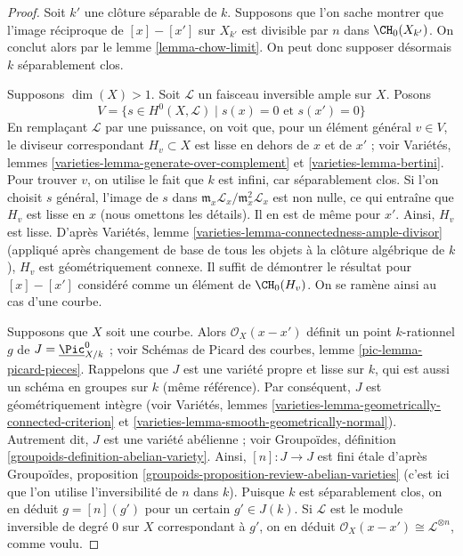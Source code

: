 \begin{proof}
Soit $k'$ une clôture séparable de $k$. Supposons que l'on sache montrer
que l'image réciproque de $[x] - [x']$ sur $X_{k'}$ est divisible par $n$ dans
$\CH_0(X_{k'})$. On conclut alors par le lemme \ref{lemma-chow-limit}.
On peut donc supposer désormais $k$ séparablement clos.

\medskip\noindent
Supposons $\dim(X) > 1$. Soit $\mathcal{L}$ un faisceau inversible ample sur $X$.
Posons
$$
V = \{s \in H^0(X, \mathcal{L}) \mid s(x) = 0\text{ et }s(x') = 0 \}
$$
En remplaçant $\mathcal{L}$ par une puissance, on voit que, pour
un élément général $v \in V$, le diviseur correspondant $H_v \subset X$ est lisse
en dehors de $x$ et de $x'$ ; voir
Variétés, lemmes \ref{varieties-lemma-generate-over-complement} et
\ref{varieties-lemma-bertini}. Pour trouver $v$, on utilise le fait que $k$ est infini,
car séparablement clos.
Si l'on choisit $s$ général, l'image de $s$ dans
$\mathfrak m_x\mathcal{L}_x/\mathfrak m_x^2\mathcal{L}_x$
est non nulle, ce qui entraîne que $H_v$ est lisse en $x$
(nous omettons les détails). Il en est de même pour $x'$. Ainsi, $H_v$ est lisse.
D'après Variétés, lemme \ref{varieties-lemma-connectedness-ample-divisor}
(appliqué après changement de base de tous les objets
à la clôture algébrique de $k$),
$H_v$ est géométriquement connexe.
Il suffit de démontrer le résultat pour
$[x] - [x']$ considéré comme un élément de $\CH_0(H_v)$.
On se ramène ainsi au cas d'une courbe.

\medskip\noindent
Supposons que $X$ soit une courbe. Alors $\mathcal{O}_X(x - x')$
définit un point $k$-rationnel $g$ de $J = \underline{\Pic}^0_{X/k}$ ; voir
Schémas de Picard des courbes, lemme \ref{pic-lemma-picard-pieces}.
Rappelons que $J$ est une variété propre et lisse sur $k$,
qui est aussi un schéma en groupes sur $k$ (même référence).
Par conséquent, $J$ est géométriquement intègre
(voir Variétés, lemmes \ref{varieties-lemma-geometrically-connected-criterion}
et \ref{varieties-lemma-smooth-geometrically-normal}).
Autrement dit, $J$ est une variété abélienne ; voir
Groupoïdes, définition \ref{groupoids-definition-abelian-variety}.
Ainsi, $[n] : J \to J$ est fini \'etale d'après
Groupoïdes, proposition \ref{groupoids-proposition-review-abelian-varieties}
(c'est ici que l'on utilise l'inversibilité de $n$ dans $k$).
Puisque $k$ est séparablement clos, on en déduit $g = [n](g')$
pour un certain $g' \in J(k)$. Si $\mathcal{L}$ est le module inversible de degré $0$
sur $X$ correspondant à $g'$, on en déduit
$\mathcal{O}_X(x - x') \cong \mathcal{L}^{\otimes n}$, comme voulu.
\end{proof}

